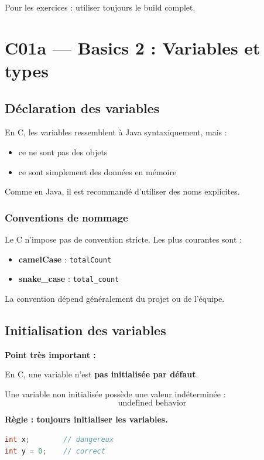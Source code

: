 Pour les exercices : utiliser toujours le build complet.

\section{C01a — Basics 2 : Variables et types}

\subsection{Déclaration des variables}

En C, les variables ressemblent à Java syntaxiquement, mais :

\begin{itemize}
    \item ce ne sont pas des objets
    \item ce sont simplement des données en mémoire
\end{itemize}

Comme en Java, il est recommandé d’utiliser des noms explicites.

\subsubsection{Conventions de nommage}

Le C n’impose pas de convention stricte. Les plus courantes sont :

\begin{itemize}
    \item \textbf{camelCase} : \texttt{totalCount}
    \item \textbf{snake\_case} : \texttt{total\_count}
\end{itemize}

La convention dépend généralement du projet ou de l’équipe.

\subsection{Initialisation des variables}

\textbf{Point très important :}

En C, une variable n’est \textbf{pas initialisée par défaut}.

Une variable non initialisée possède une valeur indéterminée :
\[
\text{undefined behavior}
\]

\textbf{Règle : toujours initialiser les variables.}

\begin{lstlisting}[language=C]
int x;        // dangereux
int y = 0;    // correct
\end{lstlisting}

